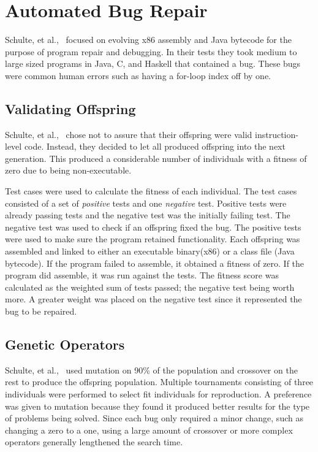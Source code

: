\documentclass{sig-alternate}
\begin{document}
\section{Automated Bug Repair}
Schulte, et al.,~\cite{Assembly:2010} focused on evolving x86 assembly and Java bytecode for the purpose of program repair and debugging. In their tests they took medium to large sized programs in Java, C, and Haskell that contained a bug. These bugs were common human errors such as having a for-loop index off by one. 
\subsection{Validating Offspring} 
Schulte, et al.,~\cite{Assembly:2010} chose not to assure that their offspring were valid instruction-level code. Instead, they decided to let all produced offspring into the next generation. This produced a considerable number of individuals with a fitness of zero due to being non-executable.

Test cases were used to calculate the fitness of each individual. The test cases consisted of a set of \textit{positive} tests and one \textit{negative} test. Positive tests were already passing tests and the negative test was the initially failing test. The negative test was used to check if an offspring fixed the bug. The positive tests were used to make sure the program retained functionality. Each offspring was assembled and linked to either an executable binary(x86) or a class file (Java bytecode). If the program failed to assemble, it obtained a fitness of zero. If the program did assemble, it was run against the tests. The fitness score was calculated as the weighted sum of tests passed; the negative test being worth more. A greater weight was placed on the negative test since it represented the bug to be repaired.

\subsection{Genetic Operators}
Schulte, et al.,~\cite{Assembly:2010} used mutation on 90\% of the population and crossover on the rest to produce the offspring population. Multiple tournaments consisting of three individuals were performed to select fit individuals for reproduction. A preference was given to mutation because they found it produced better results for the type of problems being solved. Since each bug only required a minor change, such as changing a zero to a one, using a large amount of crossover or more complex operators generally lengthened the search time.
\end{document}
